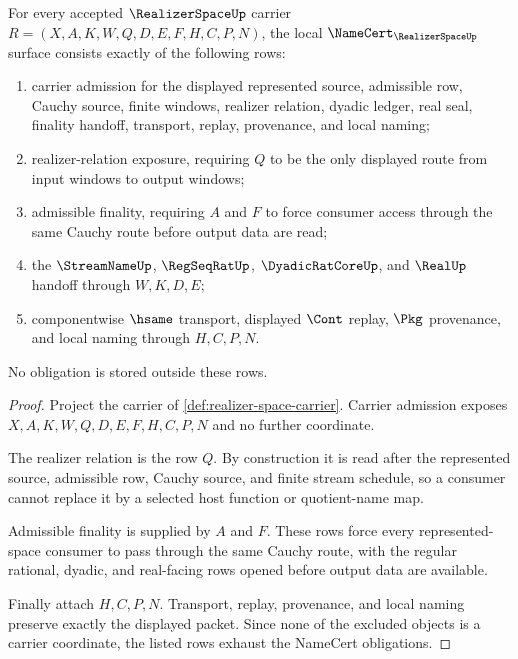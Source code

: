 \begin{theorem}
\label{thm:realizer-space-namecert-obligations}
For every accepted $\RealizerSpaceUp$ carrier
$R=(X,A,K,W,Q,D,E,F,H,C,P,N)$, the local
$\NameCert_{\RealizerSpaceUp}$ surface consists exactly of the following rows:
\begin{enumerate}
\item carrier admission for the displayed represented source, admissible row,
Cauchy source, finite windows, realizer relation, dyadic ledger, real seal,
finality handoff, transport, replay, provenance, and local naming;
\item realizer-relation exposure, requiring $Q$ to be the only displayed route
from input windows to output windows;
\item admissible finality, requiring $A$ and $F$ to force consumer access
through the same Cauchy route before output data are read;
\item the $\StreamNameUp$, $\RegSeqRatUp$, $\DyadicRatCoreUp$, and $\RealUp$
handoff through $W,K,D,E$;
\item componentwise $\hsame$ transport, displayed $\Cont$ replay, $\Pkg$
provenance, and local naming through $H,C,P,N$.
\end{enumerate}
No obligation is stored outside these rows.
\end{theorem}
\begin{proof}
Project the carrier of \autoref{def:realizer-space-carrier}. Carrier admission
exposes $X,A,K,W,Q,D,E,F,H,C,P,N$ and no further coordinate.

The realizer relation is the row $Q$. By construction it is read after the
represented source, admissible row, Cauchy source, and finite stream schedule,
so a consumer cannot replace it by a selected host function or quotient-name
map.

Admissible finality is supplied by $A$ and $F$. These rows force every
represented-space consumer to pass through the same Cauchy route, with the
regular rational, dyadic, and real-facing rows opened before output data are
available.

Finally attach $H,C,P,N$. Transport, replay, provenance, and local naming
preserve exactly the displayed packet. Since none of the excluded objects is a
carrier coordinate, the listed rows exhaust the NameCert obligations.
\end{proof}

